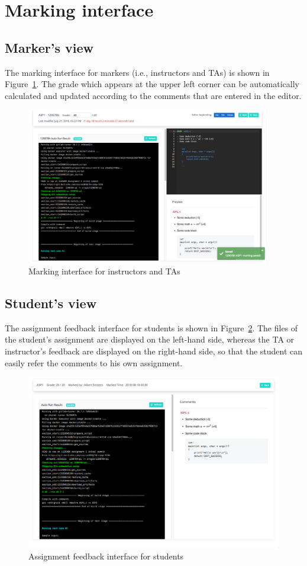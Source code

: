 \section{Marking interface}
\subsection{Marker's view}
The marking interface for markers (i.e., instructors and TAs) is shown in
Figure~\ref{fig:MARKING}. The grade which appears at the upper left corner can
be automatically calculated and updated according to the comments that are
entered in the editor.

\begin{figure}[H]
    \centering
        \includegraphics[width=0.95\textwidth]{figures/marker}
    \caption{Marking interface for instructors and TAs}
    \label{fig:MARKING}
\end{figure}

\subsection{Student's view}
The assignment feedback interface for students is shown in
Figure~\ref{fig:FEEDBACK}.
The files of the student's assignment are displayed on the left-hand side,
whereas the TA or instructor's feedback are displayed on the right-hand side,
so that the student can easily refer the comments to his own assignment.

\begin{figure}[H]
    \centering
        \includegraphics[width=1.0\textwidth]{figures/feedback}
    \caption{Assignment feedback interface for students}
    \label{fig:FEEDBACK}
\end{figure}
